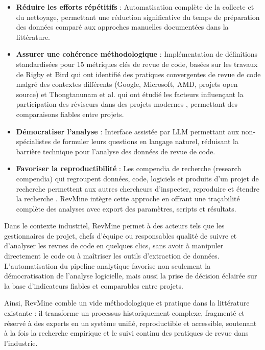 \begin{itemize}
    \item \textbf{Réduire les efforts répétitifs} : Automatisation complète de la collecte et du nettoyage, permettant une réduction significative du temps de préparation des données comparé aux approches manuelles documentées dans la littérature.
    
    \item \textbf{Assurer une cohérence méthodologique} : Implémentation de définitions standardisées pour 15 métriques clés de revue de code, basées sur les travaux de Rigby et Bird qui ont identifié des pratiques convergentes de revue de code malgré des contextes différents (Google, Microsoft, AMD, projets open source) \cite{rigby2013convergent} et Thongtanunam et al. qui ont étudié les facteurs influençant la participation des réviseurs dans des projets modernes \cite{thongtanunam2017review}, permettant des comparaisons fiables entre projets.
    
    \item \textbf{Démocratiser l'analyse} : Interface assistée par LLM permettant aux non-spécialistes de formuler leurs questions en langage naturel, réduisant la barrière technique pour l'analyse des données de revue de code.
    
    \item \textbf{Favoriser la reproductibilité} : Les compendia de recherche (research compendia) qui regroupent données, code, logiciels et produits d'un projet de recherche permettent aux autres chercheurs d'inspecter, reproduire et étendre la recherche \cite{alston2021beginner}. RevMine intègre cette approche en offrant une traçabilité complète des analyses avec export des paramètres, scripts et résultats.
\end{itemize}

Dans le contexte industriel, RevMine permet à des acteurs tels que les gestionnaires de projet, chefs d'équipe ou responsables qualité de suivre et d'analyser les revues de code en quelques clics, sans avoir à manipuler directement le code ou à maîtriser les outils d'extraction de données. L'automatisation du pipeline analytique favorise non seulement la démocratisation de l'analyse logicielle, mais aussi la prise de décision éclairée sur la base d'indicateurs fiables et comparables entre projets.

Ainsi, RevMine comble un vide méthodologique et pratique dans la littérature existante : il transforme un processus historiquement complexe, fragmenté et réservé à des experts en un système unifié, reproductible et accessible, soutenant à la fois la recherche empirique et le suivi continu des pratiques de revue dans l'industrie.